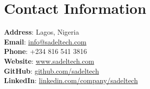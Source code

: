 \documentclass[letterpaper,11pt]{article}
\begin{document}
\section{Contact Information}
 \begin{itemize}[leftmargin=0.15in, label={}]
    \small{\item{
     \textbf{Address}{: Lagos, Nigeria} \\
     \textbf{Email}{: \href{mailto:info@sadeltech.com}{info@sadeltech.com}} \\
     \textbf{Phone}{: +234 816 541 3816} \\
     \textbf{Website}{: \href{https://sadeltech.com}{www.sadeltech.com}} \\
     \textbf{GitHub}{: \href{https://github.com/sadeltech}{github.com/sadeltech}} \\
     \textbf{LinkedIn}{: \href{https://linkedin.com/company/sadeltech}{linkedin.com/company/sadeltech}} \\
    }}
 \end{itemize}

\end{document}
